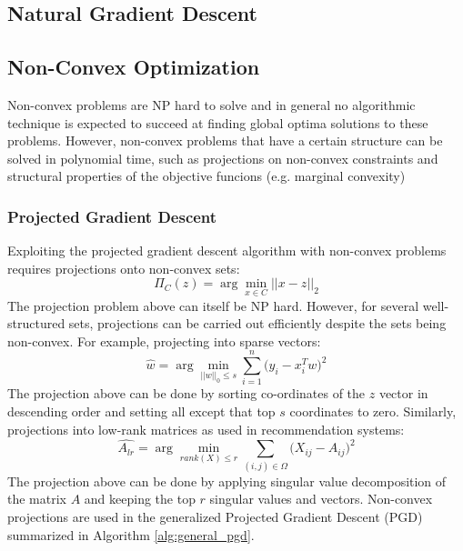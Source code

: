 \subsection{Natural Gradient Descent}

\subsection{Non-Convex Optimization}

Non-convex problems are NP hard to solve and in general no algorithmic technique is expected to succeed at finding global optima solutions to these problems. However, non-convex problems that have a certain structure can be solved in polynomial time, such as projections on non-convex constraints and structural properties of the objective funcions (e.g. marginal convexity) \cite{NonConvexML}

\subsubsection{Projected Gradient Descent}

Exploiting the projected gradient descent algorithm with non-convex problems requires projections onto non-convex sets:
\begin{equation}
    \Pi_{C}(z) = \arg \min_{x \in C} ||x-z||_2
\end{equation}
The projection problem above can itself be NP hard. However, for several well-structured sets, projections can be carried out efficiently despite the sets being non-convex. For example, projecting into sparse vectors:
\begin{equation}
    \hat{w} = \arg \min_{||w||_0 \leq s} \sum_{i=1}^{n}\big(y_i - x_{i}^{T}w \big)^{2}
\end{equation}
The projection above can be done by sorting co-ordinates of the $z$ vector in descending order and setting all except that top $s$ coordinates to zero. Similarly, projections into low-rank matrices as used in recommendation systems:
\begin{equation}
    \hat{A_{lr}} = \arg \min_{rank(X) \leq r}\sum_{(i,j)\in \Omega}\big(X_{ij} - A_{ij}\big)^{2}
\end{equation}
The projection above can be done by applying singular value decomposition of the matrix $A$ and keeping the top $r$ singular values and vectors. Non-convex projections are used in the generalized Projected Gradient Descent (PGD) summarized in Algorithm \ref{alg:general_pgd}.


